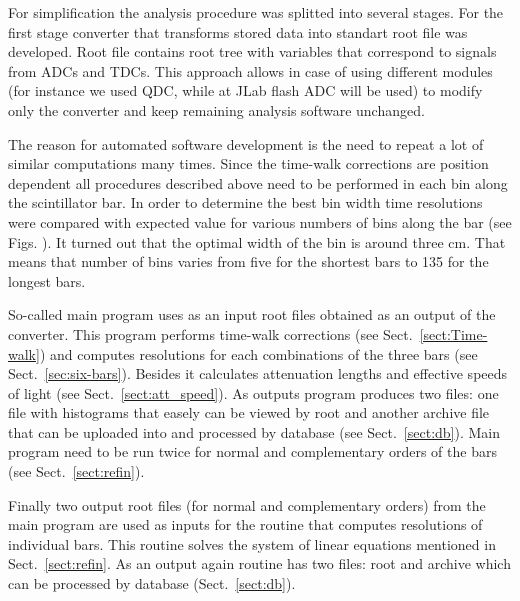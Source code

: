 For simplification the analysis procedure was splitted into several stages. For the first stage converter that transforms stored data into standart root file was developed. Root file contains root tree with variables that correspond to signals from ADCs and TDCs. This approach allows in case of using different modules (for instance we used QDC, while at JLab flash ADC will be used) to modify only the converter and keep remaining analysis software unchanged.


The reason for  automated  software development is the need to repeat a lot of similar computations many times. Since the time-walk corrections are position dependent all procedures described above need to be performed in each bin along the scintillator bar. In order to determine the best bin width time resolutions were compared with expected value for various numbers of bins along the bar (see Figs. ). It turned out that the optimal width of the bin is around three cm. That means that number of bins varies from five for the shortest bars to 135 for the longest bars. 

So-called main program uses as an input root files obtained as an output of the converter. This program performs time-walk corrections (see Sect.~\ref{sect:Time-walk}) and computes resolutions for each combinations of the three bars (see Sect.~\ref{sec:six-bars}). Besides it calculates attenuation lengths and effective speeds of light (see Sect.~\ref{sect:att_speed}). As outputs program produces two files: one file with histograms that easely can be viewed by root and another archive file that can be uploaded into and processed by database (see Sect.~\ref{sect:db}). Main program need to be run twice for normal and complementary orders of the bars (see Sect.~\ref{sect:refin}).

Finally two output root files (for normal and complementary orders) from the  main program are used as inputs for the routine that computes resolutions of individual bars. This routine solves the system of linear equations mentioned in Sect.~\ref{sect:refin}.  As an output again routine has two files: root and archive which can be processed by database (Sect.~\ref{sect:db}).
